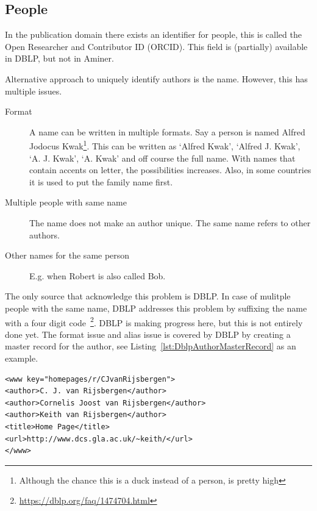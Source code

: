\documentclass{ou-report}
\begin{document}
\subsection{People}
\label{sec:integrability_people}
In the publication domain there exists an identifier for people, this is called
the Open Researcher and Contributor ID (ORCID). This field is (partially) 
available in DBLP, but not in Aminer.

Alternative approach to uniquely identify authors is the name. However, this has
multiple issues. 
\begin{description}
    \item[Format] A name can be written in multiple formats. Say a person is 
    named Alfred Jodocus Kwak\footnote{Although the chance this is a duck 
    instead of a person, is pretty high}. This can be written as `Alfred Kwak', 
    `Alfred J. Kwak', `A. J. Kwak', `A. Kwak' and off course the full name. 
    With names that contain accents on letter, the possibilities increases.
    Also, in some countries it is used to put the family name first.
    \item[Multiple people with same name] The name does not make an author unique. The same name
    refers to other authors. 
    \item[Other names for the same person] E.g. when Robert is also called Bob.
\end{description}

The only source that acknowledge this problem is DBLP. In case of mulitple 
people with the same name, DBLP addresses this problem by suffixing the
name with a four digit code~\footnote{\url{https://dblp.org/faq/1474704.html}}.
DBLP is making progress here, but this is not entirely done yet. 
The format issue and alias issue is covered by DBLP by creating a master 
record for the author, see Listing~\ref{lst:DblpAuthorMasterRecord} as an 
example.
\lstset{language=XML}
\begin{lstlisting}[caption={Example master record(https://dblp.org/faq/1474690.html)},label={lst:DblpAuthorMasterRecord}]
<www key="homepages/r/CJvanRijsbergen">
<author>C. J. van Rijsbergen</author>
<author>Cornelis Joost van Rijsbergen</author>
<author>Keith van Rijsbergen</author>
<title>Home Page</title>
<url>http://www.dcs.gla.ac.uk/~keith/</url>
</www>
\end{lstlisting}
\end{document}
